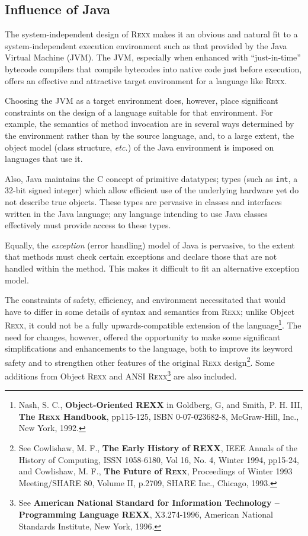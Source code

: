 \subsection{Influence of Java}
The system-independent design of R\textsc{exx} makes it an obvious and natural
fit to a system-independent execution environment such as that
provided by the Java Virtual Machine (JVM). The JVM, especially when
enhanced with “just-in-time” bytecode compilers that compile bytecodes
into native code just before execution, offers an effective and
attractive target environment for a language like R\textsc{exx}.

Choosing the JVM as a target environment does, however, place significant constraints on the design of a language suitable for that environment. For example, the semantics of method invocation are in several ways determined by the environment rather than by the source language, and, to a large extent, the object model (class structure, \emph{etc.}) of the Java environment is imposed on languages that use it.

Also, Java maintains the C concept of primitive datatypes; types (such
as \texttt{int}, a 32-bit signed integer) which allow efficient use of the underlying hardware yet do not describe true objects. These types are pervasive in classes and interfaces written in the Java language; any language intending to use Java classes effectively must provide access to these types.

Equally, the \emph{exception} (error handling) model of Java is pervasive, to
the extent that methods must check certain exceptions and declare
those that are not handled within the method. This makes it difficult
to fit an alternative exception model.

The constraints of safety, efficiency, and environment necessitated
that \nr{} would have to differ in some details of syntax and
semantics from R\textsc{exx}; unlike Object R\textsc{exx}, it could not be a fully
upwards-compatible extension of the language\footnote{Nash, S. C.,
  \textbf{Object-Oriented REXX} in Goldberg, G, and Smith, P. H. III,
  \textbf{The R\textsc{exx} Handbook}, pp115-125, ISBN 0-07-023682-8,
  McGraw-Hill, Inc., New York, 1992.}. The need for changes, however,
offered the opportunity to make some significant simplifications and
enhancements to the language, both to improve its keyword safety and to strengthen other features of the original R\textsc{exx} design\footnote{See Cowlishaw, M. F., \textbf{The Early History of REXX}, IEEE Annals of the History of Computing, ISSN 1058-6180, Vol 16, No. 4, Winter 1994, pp15-24, and Cowlishaw, M. F., \textbf{The Future of R\textsc{exx}}, Proceedings of Winter 1993 Meeting/SHARE 80, Volume II, p.2709, SHARE Inc., Chicago, 1993.}. Some additions from Object R\textsc{exx} and ANSI R\textsc{exx}\footnote{See \textbf{American National Standard for Information Technology – Programming Language REXX}, X3.274-1996, American National Standards Institute, New York, 1996.} are also included.


